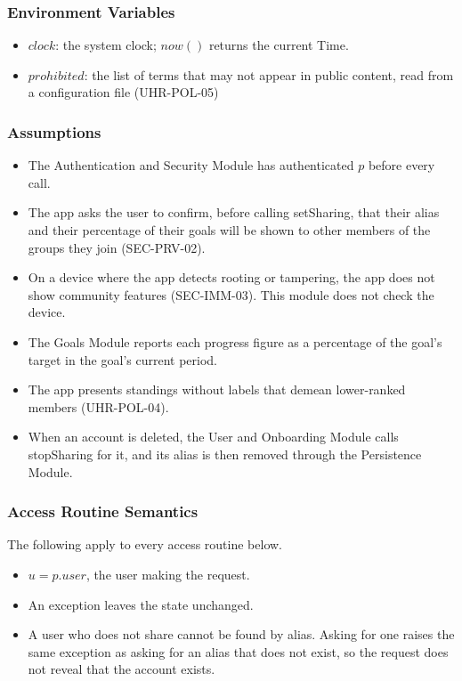 \documentclass[12pt, titlepage]{article}
\begin{document}
\subsubsection{Environment Variables}

\begin{itemize}
\item $\mathit{clock}$: the system clock; $\mathit{now}()$ returns the
  current Time.
\item $\mathit{prohibited}$: the list of terms that may not appear in
  public content, read from a configuration file (UHR-POL-05)
\end{itemize}

\subsubsection{Assumptions}

\begin{itemize}
\item The Authentication and Security Module has authenticated $p$ before
  every call.
\item The app asks the user to confirm, before calling setSharing, that
  their alias and their percentage of their goals will be shown to other
  members of the groups they join (SEC-PRV-02).
\item On a device where the app detects rooting or tampering, the app does
  not show community features (SEC-IMM-03). This module does not check the
  device.
\item The Goals Module reports each progress figure as a percentage of the
  goal's target in the goal's current period.
\item The app presents standings without labels that demean lower-ranked
  members (UHR-POL-04).
\item When an account is deleted, the User and Onboarding Module calls
  stopSharing for it, and its alias is then removed through the Persistence
  Module.
\end{itemize}

\subsubsection{Access Routine Semantics}

\noindent The following apply to every access routine below.

\begin{itemize}
\item $u = p.\mathit{user}$, the user making the request.
\item An exception leaves the state unchanged.
\item A user who does not share cannot be found by alias. Asking for one
  raises the same exception as asking for an alias that does not exist, so
  the request does not reveal that the account exists.
\end{itemize}
\end{document}
